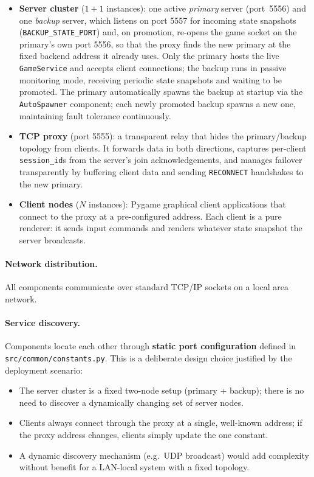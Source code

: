 \documentclass{scrartcl}
\begin{document}
\begin{itemize}
    \item \textbf{Server cluster} ($1 + 1$ instances): one active \emph{primary} server (port~5556) and one \emph{backup} server, which listens on port 5557 for incoming state snapshots (\texttt{BACKUP\_STATE\_PORT}) and, on promotion, re-opens the game socket on the primary's own port 5556, so that the proxy finds the new primary at the fixed backend address it already uses. Only the primary hosts the live \texttt{GameService} and accepts client connections; the backup runs in passive monitoring mode, receiving periodic state snapshots and waiting to be promoted. The primary automatically spawns the backup at startup via the \texttt{AutoSpawner} component; each newly promoted backup spawns a new one, maintaining fault tolerance continuously.

    \item \textbf{TCP proxy} (port 5555): a transparent relay that hides the primary/backup topology from clients. It forwards data in both directions, captures per-client \texttt{session\_id}s from the server's join acknowledgements, and manages failover transparently by buffering client data and sending \texttt{RECONNECT} handshakes to the new primary.

    \item \textbf{Client nodes} ($N$ instances): Pygame graphical client applications that connect to the proxy at a pre-configured address. Each client is a pure renderer: it sends input commands and renders whatever state snapshot the server broadcasts.
\end{itemize}

\paragraph{Network distribution.}
All components communicate over standard TCP/IP sockets on a local area network.

\paragraph{Service discovery.}
Components locate each other through \textbf{static port configuration} defined in \texttt{src/common/constants.py}.
This is a deliberate design choice justified by the deployment scenario:
\begin{itemize}
    \item The server cluster is a fixed two-node setup (primary + backup); there is no need to discover a dynamically changing set of server nodes.
    \item Clients always connect through the proxy at a single, well-known address; if the proxy address changes, clients simply update the one constant.
    \item A dynamic discovery mechanism (e.g.\ UDP broadcast) would add complexity without benefit for a LAN-local system with a fixed topology.
\end{itemize}
\end{document}
